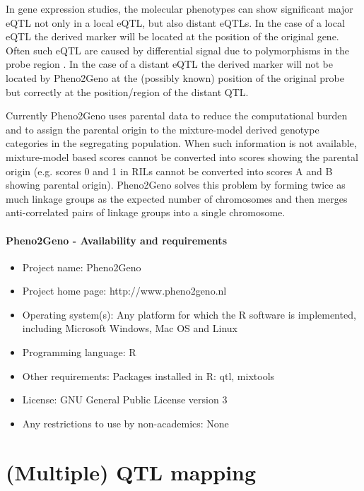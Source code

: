 \documentclass[8pt, twoside, a5paper]{report}
\begin{document}
In gene expression studies, the molecular phenotypes can show significant major eQTL not only in a local eQTL, but also distant eQTLs. 
In the case of a local eQTL the derived marker will be located at the position of the original gene. Often such eQTL are caused by 
differential signal due to polymorphisms in the probe region \cite{Alberts:2005,Alberts:2007}. In the case of a distant eQTL the 
derived marker will not be located by Pheno2Geno at the (possibly known) position of the original probe but correctly at the 
position/region of the distant QTL. \newline

Currently Pheno2Geno uses parental data to reduce the computational burden and to assign the parental origin to the mixture-model 
derived genotype categories in the segregating population. When such information is not available, mixture-model based scores 
cannot be converted into scores showing the parental origin (e.g. scores 0 and 1 in RILs cannot be converted into scores A and B 
showing parental origin). Pheno2Geno solves this problem by forming twice as much linkage groups as the expected number of 
chromosomes and then merges anti-correlated pairs of linkage groups into a single chromosome. \newline

\subsubsection{Pheno2Geno - Availability and requirements}
\begin{itemize}
\item Project name: Pheno2Geno
\item Project home page: http://www.pheno2geno.nl
\item Operating system(s): Any platform for which the R software\cite{rgui} is implemented, including Microsoft Windows, Mac OS and Linux
\item Programming language: R
\item Other requirements: Packages installed in R: qtl, mixtools\cite{Benaglia:2009}
\item License: GNU General Public License version 3
\item Any restrictions to use by non-academics: None
\end{itemize}




\chapter{(Multiple) QTL mapping}
\end{document}
